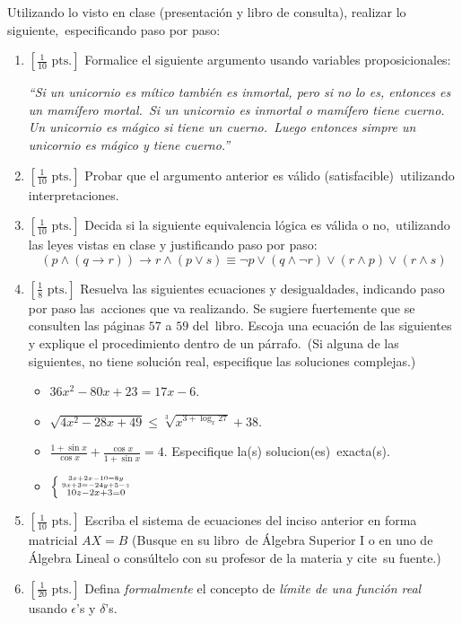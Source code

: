 \documentclass[paper=letter, fontsize=12pt]{scrartcl}
\begin{document}
\noindent
Utilizando lo visto en clase (presentación y libro de consulta), realizar lo siguiente,\
especificando paso por paso:
\newpage
\begin{enumerate}
\item $[\frac{1}{10}\mbox{ pts.}]$ Formalice el siguiente argumento usando variables proposicionales:\par
 \emph{``Si un unicornio es mítico también es inmortal, pero si no lo es, entonces es un mamífero mortal.\
  Si un unicornio es inmortal o mamífero tiene cuerno. Un unicornio es mágico si tiene un cuerno.\
  Luego entonces simpre un unicornio es mágico y tiene cuerno.''}
\item $[\frac{1}{10}\mbox{ pts.}]$ Probar que el argumento anterior es válido (satisfacible)\
  utilizando interpretaciones.
\item $[\frac{1}{10}\mbox{ pts.}]$ Decida si la siguiente equivalencia lógica es válida o no,\
  utilizando las leyes vistas en clase y justificando paso por paso:
  \[
  (p \wedge  (q \to r)) \to r \wedge (p \vee s)
  \equiv
  \neg p \vee (q \wedge \neg r) \vee (r \wedge p) \vee (r \wedge s)
  \]
\item $[\frac{1}{8}\mbox{ pts.}]$ Resuelva las siguientes ecuaciones y desigualdades, indicando paso por paso las\
  acciones que va realizando. Se sugiere fuertemente que se consulten las páginas $57$ a $59$ del\
  libro. Escoja una ecuación de las siguientes y explique el procedimiento dentro de un párrafo.\
  (Si alguna de las siguientes, no tiene solución real, especifique las soluciones complejas.)
  \begin{itemize}
  \item $36x^2 - 80x + 23 = 17x - 6$.
  \item $\displaystyle{\sqrt{4x^2 - 28x + 49} \leq \sqrt[3]{x^{3 + \log_x 27}} + 38}$.
  \item $\displaystyle{\frac{1 + \sin x}{\cos x} + \frac{\cos x}{1 + \sin x} = 4}$. Especifique la(s) solucion(es)\
    exacta(s).
  \item
    $\left\{
    {{
      3x + 2x - 10 = 8y
      \atop
      9x + 3 = -24y + 5 - z
   } }\atop
      10z - 2x + 3 = 0
    \right.$
  \end{itemize}
\item $[\frac{1}{10}\mbox{ pts.}]$ Escriba el sistema de ecuaciones del inciso anterior en forma matricial $AX = B$ (Busque en su libro\
  de Álgebra Superior I o en uno de Álgebra Lineal o consúltelo con su profesor de la materia y cite\
  su fuente.)
\item $[\frac{1}{20}\mbox{ pts.}]$ Defina \emph{formalmente} el concepto de \emph{límite de una función real} usando $\epsilon$'s y $\delta$'s.

\end{enumerate}
\end{document}
